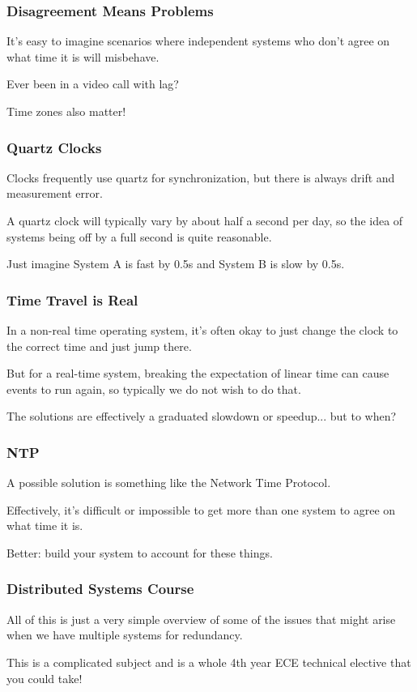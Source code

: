 \begin{frame}
\frametitle{Disagreement Means Problems}

It's easy to imagine scenarios where independent systems who don't agree on what time it is will misbehave.

Ever been in a video call with lag?

Time zones also matter!

\end{frame}

\begin{frame}
\frametitle{Quartz Clocks}

Clocks frequently use quartz for synchronization, but there is always drift and measurement error.

A quartz clock will typically vary by about half a second per day, so the idea of systems being off by a full second is quite reasonable.


Just imagine System A is fast by 0.5s and System B is slow by 0.5s.

\end{frame}

\begin{frame}
\frametitle{Time Travel is Real}

In a non-real time operating system, it's often okay to just change the clock to the correct time and just jump there.

But for a real-time system, breaking the expectation of linear time can cause events to run again, so typically we do not wish to do that.

The solutions are effectively a graduated slowdown or speedup... but to when?

\end{frame}

\begin{frame}
\frametitle{NTP}
A possible solution is something like the Network Time Protocol.

Effectively, it's difficult or impossible to get more than one system to agree on what time it is. 

Better: build your system to account for these things.

\end{frame}

\begin{frame}
\frametitle{Distributed Systems Course}

All of this is just a very simple overview of some of the issues that might arise when we have multiple systems for redundancy. 

This is a complicated subject and is a whole 4th year ECE technical elective that you could take!


\end{frame}



